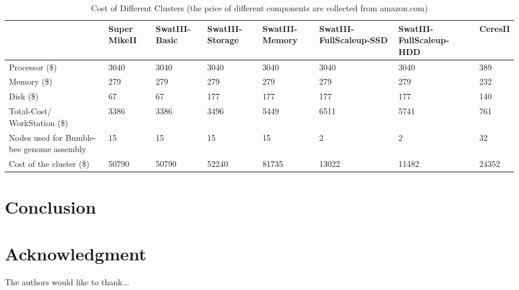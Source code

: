 \documentclass[conference]{IEEEtran}
\begin{document}
\begin{table}
\begin{center}
    \begin{tabular}{ |p{1.8cm} | p{1.3cm} | p{1.3cm} | p{1.3cm} | p{1.3cm} | p{1.3cm} | p{1.3cm}| p{1.3cm}|} \hline
    & Super MikeII & SwatIII-Basic & SwatIII-Storage & SwatIII-Memory & SwatIII-FullScaleup-SSD & SwatIII-FullScaleup-HDD & CeresII \\ \hline
    Processor (\$) & 3040 & 3040 & 3040 & 3040 & 3040 & 3040 & 389 \\ \hline
    Memory (\$) & 279 & 279 & 279 & 279 & 279 & 279 & 232\\ \hline
    Disk (\$) & 67 & 67 & 177 & 177 & 177 & 177 &  140\\ \hline
    Total-Cost/ WorkStation (\$) & 3386 & 3386 & 3496 & 5449 & 6511 & 5741 & 761\\ \hline
    Nodes used for Bumble-bee genome assembly & 15 & 15 & 15 & 15 & 2 & 2 & 32 \\ \hline
    Cost of the cluster (\$) & 50790 & 50790 & 52240 & 81735 & 13022 & 11482 & 24352 \\ \hline
	\end{tabular}
    \caption{Cost of Different Clusters (the price of different components are collected from amazon.com)}
	\label{table:PricePerWorkstation}
\end{center}
\end{table}

\section {Conclusion}





\section*{Acknowledgment}


The authors would like to thank...





\end{document}
